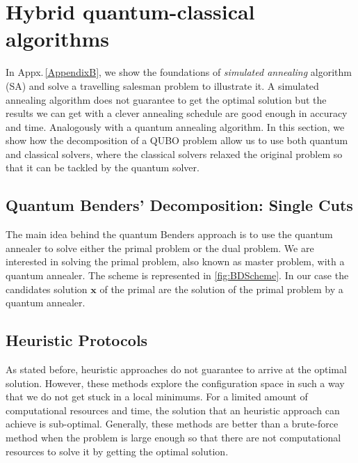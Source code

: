 \section{Hybrid quantum-classical algorithms}
In Appx.\,\ref{AppendixB}, we show the foundations of \textit{simulated annealing} algorithm (SA) and solve a travelling salesman problem to illustrate it. A simulated annealing algorithm does not guarantee to get the optimal solution but the results we can get with a clever annealing schedule are good enough in accuracy and time. Analogously with a quantum annealing algorithm. In this section, we show how the decomposition of a QUBO problem allow us to use both quantum and classical solvers, where the classical solvers relaxed the original problem so that it can be tackled by the quantum solver.
\subsection{Quantum Benders' Decomposition: Single Cuts}
The main idea behind the quantum Benders approach is to use the quantum annealer to solve either the primal problem or the dual problem. We are interested in solving the primal problem, also known as master problem, with a quantum annealer. The scheme is represented in \ref{fig:BDScheme}. In our case the candidates solution $\textbf{x}$ of the primal are the solution of the primal problem by a quantum annealer.
\subsection{Heuristic Protocols}
As stated before, heuristic approaches do not guarantee to arrive at the optimal solution. However, these methods explore the configuration space in such a way that we do not get stuck in a local minimums. For a limited amount of computational resources and time, the solution that an heuristic approach can achieve is sub-optimal. Generally, these methods are better than a brute-force method when the problem is large enough so that there are not computational resources to solve it by getting the optimal solution.
